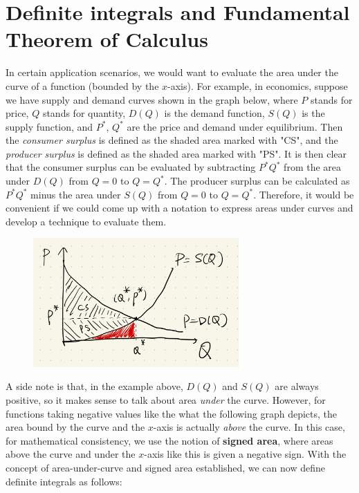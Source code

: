 \section{Definite integrals and Fundamental Theorem of Calculus}

In certain application scenarios, we would want to evaluate the area under the curve of a function (bounded by the $x$-axis).  For example, in economics, suppose we have supply and demand curves shown in the graph below, where $P$ stands for price, $Q$ stands for quantity, $D(Q)$ is the demand function, $S(Q)$ is the supply function, and $P^*$, $Q^*$ are the price and demand under equilibrium.  Then the \textit{consumer surplus} is defined as the shaded area marked with "CS", and the \textit{producer surplus} is defined as the shaded area marked with "PS".  It is then clear that the consumer surplus can be evaluated by subtracting $P^*Q^*$ from the area under $D(Q)$ from $Q = 0$ to $Q = Q^*$.  The producer surplus can be calculated as $P^*Q^*$ minus the area under $S(Q)$ from $Q = 0$ to $Q = Q^*$.  Therefore, it would be convenient if we could 
come up with a notation to express areas under curves and develop a technique to evaluate them.

\medskip
\begin{figure}[ht]
    \centering
    \includegraphics[width = 0.7\textwidth]{figures/chap 07/supply_demand.png}
\end{figure}

\medskip
A side note is that, in the example above, $D(Q)$ and $S(Q)$ are always positive, so it makes sense to talk about area \textit{under} the curve.  However, for functions taking negative values like the what the following graph depicts, the area bound by the curve and the $x$-axis is actually \textit{above} the curve.  In this case, for mathematical consistency, we use the notion of \textbf{signed area}, where areas above the curve and under the $x$-axis like this is given a negative sign.  With the concept of area-under-curve and signed area established, we can now define definite integrals as follows:

